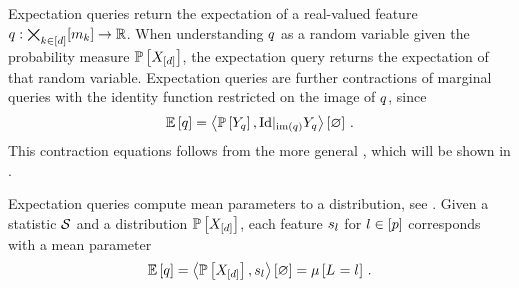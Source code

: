 Expectation queries return the expectation of a real-valued feature $q : \bigtimes_{k\in[d]}[m_{k}]\rightarrow\mathbb{R}$.
When understanding $q$ as a random variable given the probability measure $\mathbb{P}\left[X_{[d]}\right]$, the expectation query returns the expectation of that random variable.
Expectation queries are further contractions of marginal queries with the identity function restricted on the image of $q$, since
\begin{align*}
    \mathbb{E}\left[q\right]
    = \left\langle \mathbb{P}\left[Y_{q}\right],{\mathrm{Id}}|_{\mathrm{im}\left(q\right)}{Y_{q}} \right\rangle \left[ \varnothing \right] \, .
\end{align*}
This contraction equations follows from the more general , which will be shown in .

Expectation queries compute mean parameters to a distribution, see .
Given a statistic $\mathcal{S}$ and a distribution $\mathbb{P}\left[X_{[d]}\right]$, each feature $s_{l}$ for $l\in[p]$ corresponds with a mean parameter
\begin{align*}
    \mathbb{E}\left[q\right] = \left\langle \mathbb{P}\left[X_{[d]}\right],s_{l}\right\rangle \left[ \varnothing \right] = \mu\left[L_{}=l_{}\right] \, .
\end{align*}



